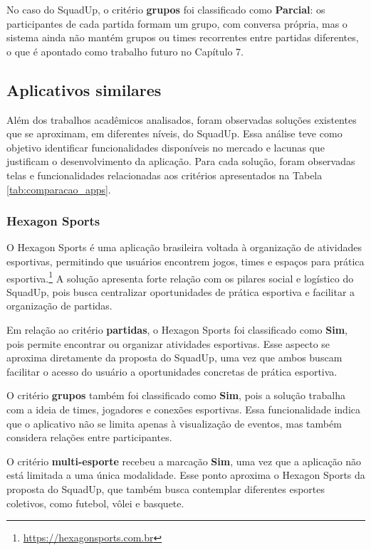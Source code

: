 \documentclass[a4paper, 12pt]{article}
\begin{document}
\begin{justify}
No caso do SquadUp, o critério \textbf{grupos} foi classificado como \textbf{Parcial}: os participantes de cada partida formam um grupo, com conversa própria, mas o sistema ainda não mantém grupos ou times recorrentes entre partidas diferentes, o que é apontado como trabalho futuro no Capítulo 7.

\subsection{Aplicativos similares}

Além dos trabalhos acadêmicos analisados, foram observadas soluções existentes que se aproximam, em diferentes níveis, do SquadUp. Essa análise teve como objetivo identificar funcionalidades disponíveis no mercado e lacunas que justificam o desenvolvimento da aplicação. Para cada solução, foram observadas telas e funcionalidades relacionadas aos critérios apresentados na Tabela \ref{tab:comparacao_apps}.

\subsubsection{Hexagon Sports}

O Hexagon Sports é uma aplicação brasileira voltada à organização de atividades esportivas, permitindo que usuários encontrem jogos, times e espaços para prática esportiva.\footnote{\url{https://hexagonsports.com.br}} A solução apresenta forte relação com os pilares social e logístico do SquadUp, pois busca centralizar oportunidades de prática esportiva e facilitar a organização de partidas.

Em relação ao critério \textbf{partidas}, o Hexagon Sports foi classificado como \textbf{Sim}, pois permite encontrar ou organizar atividades esportivas. Esse aspecto se aproxima diretamente da proposta do SquadUp, uma vez que ambos buscam facilitar o acesso do usuário a oportunidades concretas de prática esportiva.

O critério \textbf{grupos} também foi classificado como \textbf{Sim}, pois a solução trabalha com a ideia de times, jogadores e conexões esportivas. Essa funcionalidade indica que o aplicativo não se limita apenas à visualização de eventos, mas também considera relações entre participantes.

O critério \textbf{multi-esporte} recebeu a marcação \textbf{Sim}, uma vez que a aplicação não está limitada a uma única modalidade. Esse ponto aproxima o Hexagon Sports da proposta do SquadUp, que também busca contemplar diferentes esportes coletivos, como futebol, vôlei e basquete.


\end{justify}
\end{document}
